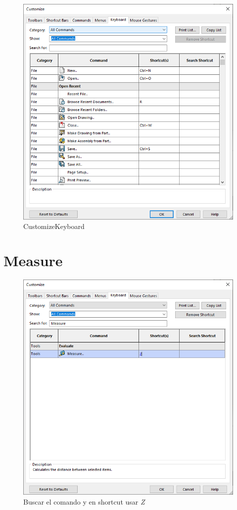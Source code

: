 \documentclass[12pt,letterpaper,final]{report}
\begin{document}
\begin{figure}[H]
	\centering
	\includegraphics[width=0.85\linewidth, height=0.65\textheight,keepaspectratio]{Imagenes/solidworks_keyboard_01}
	\caption{Customize\textrightarrow Keyboard}
	\label{fig:solidworkskeyboard01}
\end{figure}

\section{Measure}

\begin{figure}[H]
	\centering
	\includegraphics[width=0.85\linewidth, height=0.65\textheight,keepaspectratio]{Imagenes/solidworks_keyboard_02}
	\caption{Buscar el comando y en shortcut usar \emph{Z}}
	\label{fig:solidworkskeyboard02}
\end{figure}
\end{document}
